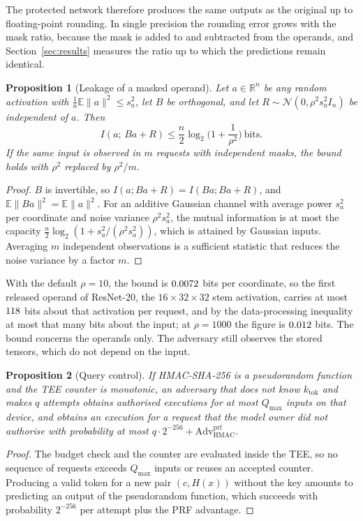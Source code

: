 \documentclass[lettersize,journal]{IEEEtran}
\newtheorem{proposition}{Proposition}
\begin{document}
The protected network therefore produces the same outputs as the original up to floating-point rounding. In single precision the rounding error grows with the mask ratio, because the mask is added to and subtracted from the operands, and Section~\ref{sec:results} measures the ratio up to which the predictions remain identical.

\begin{proposition}[Leakage of a masked operand]
\label{prop:mask}
Let $a\in\mathbb{R}^n$ be any random activation with $\frac{1}{n}\mathbb{E}\|a\|^2\le s_a^2$, let $B$ be orthogonal, and let $R\sim\mathcal{N}(0,\rho^2 s_a^2 I_n)$ be independent of $a$. Then
\begin{equation}
I(a;\,Ba+R)\le \frac{n}{2}\log_2\!\Big(1+\frac{1}{\rho^2}\Big)\ \text{bits}.
\end{equation}
If the same input is observed in $m$ requests with independent masks, the bound holds with $\rho^2$ replaced by $\rho^2/m$.
\end{proposition}
\begin{proof}
$B$ is invertible, so $I(a;Ba+R)=I(Ba;Ba+R)$, and $\mathbb{E}\|Ba\|^2=\mathbb{E}\|a\|^2$. For an additive Gaussian channel with average power $s_a^2$ per coordinate and noise variance $\rho^2 s_a^2$, the mutual information is at most the capacity $\frac{n}{2}\log_2(1+s_a^2/(\rho^2 s_a^2))$, which is attained by Gaussian inputs. Averaging $m$ independent observations is a sufficient statistic that reduces the noise variance by a factor $m$.
\end{proof}

With the default $\rho=10$, the bound is $0.0072$ bits per coordinate, so the first released operand of ResNet-20, the $16\times32\times32$ stem activation, carries at most $118$ bits about that activation per request, and by the data-processing inequality at most that many bits about the input; at $\rho=1000$ the figure is $0.012$ bits. The bound concerns the operands only. The adversary still observes the stored tensors, which do not depend on the input.

\begin{proposition}[Query control]
\label{prop:query}
If HMAC-SHA-256 is a pseudorandom function and the TEE counter is monotonic, an adversary that does not know $k_{\mathrm{tok}}$ and makes $q$ attempts obtains authorised executions for at most $Q_{\max}$ inputs on that device, and obtains an execution for a request that the model owner did not authorise with probability at most $q\cdot 2^{-256}+\mathrm{Adv}^{\mathrm{prf}}_{\mathrm{HMAC}}$.
\end{proposition}
\begin{proof}
The budget check and the counter are evaluated inside the TEE, so no sequence of requests exceeds $Q_{\max}$ inputs or reuses an accepted counter. Producing a valid token for a new pair $(c,H(x))$ without the key amounts to predicting an output of the pseudorandom function, which succeeds with probability $2^{-256}$ per attempt plus the PRF advantage.
\end{proof}
\end{document}
